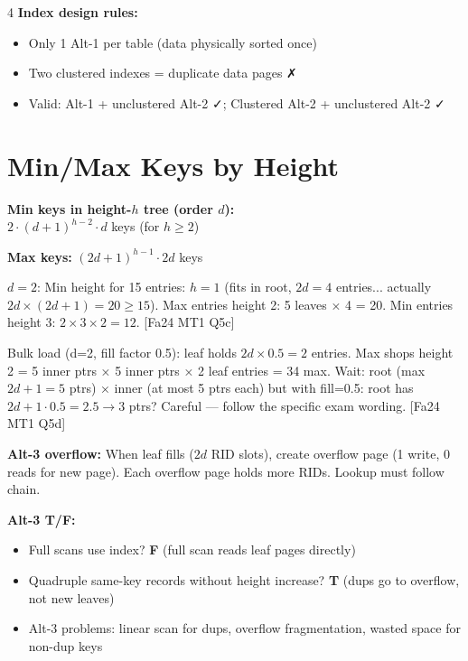 \documentclass[8pt,letterpaper]{article}
\newcommand{\key}[1]{\textbf{\color{red!70!black}#1}}
\newcommand{\ans}[1]{\textbf{\color{blue!80!black}#1}}
\newcommand{\qref}[1]{{\fontsize{3.5}{4}\selectfont\color{purple!60!black}[#1]}}
\begin{document}
\begin{multicols*}{4}
\key{Index design rules:}
\begin{itemize}
  \item Only 1 Alt-1 per table (data physically sorted once)
  \item Two clustered indexes = duplicate data pages ✗
  \item Valid: Alt-1 + unclustered Alt-2 ✓; Clustered Alt-2 + unclustered Alt-2 ✓
\end{itemize}

\section{Min/Max Keys by Height}
\key{Min keys in height-$h$ tree (order $d$):}\\
$2 \cdot (d+1)^{h-2} \cdot d$ keys (for $h\ge2$)

\key{Max keys:} $(2d+1)^{h-1} \cdot 2d$ keys

\begin{ansbox}
$d=2$: Min height for 15 entries: $h=1$ (fits in root, $2d=4$ entries... actually $2d\times(2d+1)=20\ge15$). Max entries height 2: 5 leaves × 4 = 20. Min entries height 3: $2\times3\times2=12$. \qref{Fa24 MT1 Q5c}
\end{ansbox}

\begin{ansbox}
Bulk load (d=2, fill factor 0.5): leaf holds $2d\times0.5=2$ entries. Max shops height 2 = 5 inner ptrs × 5 inner ptrs × 2 leaf entries = 34 max. Wait: root (max $2d+1=5$ ptrs) × inner (at most 5 ptrs each) but with fill=0.5: root has $2d+1\cdot0.5=2.5\to3$ ptrs? Careful — follow the specific exam wording. \qref{Fa24 MT1 Q5d}
\end{ansbox}

\key{Alt-3 overflow:} When leaf fills ($2d$ RID slots), create overflow page (1 write, 0 reads for new page). Each overflow page holds more RIDs. Lookup must follow chain.

\key{Alt-3 T/F:}
\begin{itemize}
  \item Full scans use index? \ans{F} (full scan reads leaf pages directly)
  \item Quadruple same-key records without height increase? \ans{T} (dups go to overflow, not new leaves)
  \item Alt-3 problems: linear scan for dups, overflow fragmentation, wasted space for non-dup keys
\end{itemize}


\end{multicols*}
\end{document}

